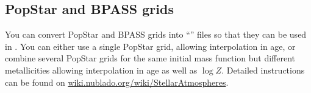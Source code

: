 \subsection{PopStar and BPASS grids}

You can convert PopStar and BPASS grids into ``'' files so
that they can be used in \Cloudy. You can either use a single PopStar grid,
allowing interpolation in age, or combine several PopStar grids for the same
initial mass function but different metallicities allowing interpolation in
age as well as $\log Z$. Detailed instructions can be found on
\href{http://gitlab.nublado.org/cloudy/cloudy/-/wikis/StellarAtmospheres}{wiki.nublado.org/wiki/StellarAtmospheres}.
